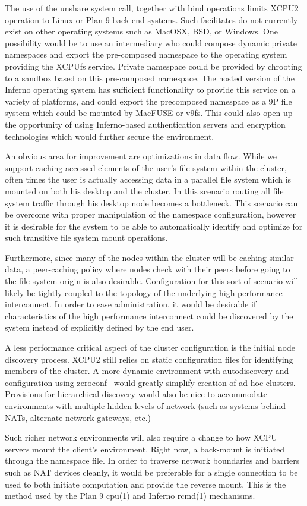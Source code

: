 The use of the unshare system call, together with bind operations limits XCPU2
operation to Linux or Plan 9 back-end systems.  Such facilitates do not currently
exist on other operating systems such as MacOSX, BSD, or Windows.  One
possibility would be to use an intermediary who could compose dynamic 
private namespaces and export the pre-composed namespace to the operating
system providing the XCPUfs service.  Private namespace could be provided by
chrooting to a sandbox based on this pre-composed namespace.
The hosted version of the Inferno operating system has sufficient functionality
to provide this service on a variety of platforms, and could export the precomposed
namespace as a 9P file system which could be mounted by MacFUSE or v9fs.
This could also open up the opportunity of using Inferno-based authentication
servers and encryption technologies which would further secure the environment.

An obvious area for improvement are optimizations in data flow.  While we
support caching accessed elements of the user's file system within the 
cluster, often times the user is actually accessing data in a parallel file
system which is mounted on both his desktop and the cluster.  In this
scenario routing all file system traffic through his desktop node becomes
a bottleneck.  This scenario can be overcome with proper manipulation of the
namespace configuration, however it is desirable for the system to be able
to automatically identify and optimize for such transitive file system
mount operations.

Furthermore, since many of the nodes within the cluster will be caching
similar data, a peer-caching policy where nodes check with their peers 
before going to the file system origin is also desirable.  Configuration
for this sort of scenario will likely be tightly coupled to the topology of
the underlying high performance interconnect.  In order to ease administration,
it would be desirable if characteristics of the high performance interconnect
could be discovered by the system instead of explicitly defined by the end
user.

A less performance critical aspect of the cluster configuration is the 
initial node discovery process.  XCPU2 still relies on static configuration
files for identifying members of the cluster.  A more dynamic environment
with autodiscovery and configuration using zeroconf~\cite{zeroconf} would
greatly simplify creation of ad-hoc clusters.  Provisions for hierarchical
discovery would also be nice to accommodate environments with multiple hidden
levels of network (such as systems behind NATs, alternate network gateways, 
etc.)

Such richer network environments will also require a change to how XCPU
servers mount the client's environment.  Right now, a back-mount is 
initiated through the namespace file.  In order to traverse network
boundaries and barriers such as NAT devices cleanly, it would be preferable
for a single connection to be used to both initiate computation and provide
the reverse mount.  This is the method used by the Plan 9 cpu(1) and Inferno
rcmd(1) mechanisms.

